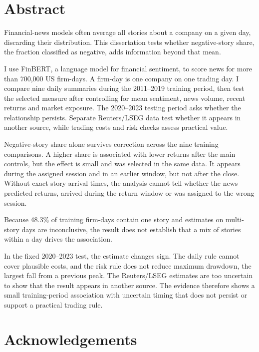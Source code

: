 \documentclass[12pt,a4paper,oneside]{book}
\begin{document}
\clearpage
\hypersetup{pageanchor=true}
\setcounter{page}{1}

\section*{Abstract}
{}

Financial-news models often average all stories about a company on a given day,
discarding their distribution. This dissertation tests whether negative-story
share, the fraction classified as negative, adds information beyond that mean.

I use FinBERT, a language model for financial sentiment, to score news for more
than 700,000 US firm-days. A firm-day is one company on one trading day. I
compare nine daily summaries during the 2011--2019 training period, then test the
selected measure after controlling for mean sentiment, news volume, recent
returns and market exposure. The 2020--2023 testing period asks whether the
relationship persists. Separate Reuters/LSEG data test whether it appears in
another source, while trading costs and risk checks assess practical value.

Negative-story share alone survives correction across the nine training
comparisons. A higher share is associated with lower returns after the main
controls, but the effect is small and was selected in the same data. It appears
during the assigned session and in an earlier window, but not after the close.
Without exact story arrival times, the analysis cannot tell whether the news
predicted returns, arrived during the return window or was assigned to the wrong
session.

Because 48.3\% of training firm-days contain one story and estimates on
multi-story days are inconclusive, the result does not establish that a
mix of stories within a day drives the association.

In the fixed 2020--2023 test, the estimate changes sign. The daily rule cannot
cover plausible costs, and the risk rule does not reduce maximum drawdown, the
largest fall from a previous peak. The Reuters/LSEG estimates are too uncertain
to show that the result appears in another source. The evidence therefore shows
a small training-period association with uncertain timing that does not persist
or support a practical trading rule.

\clearpage
\section*{Acknowledgements}
{}
\end{document}

